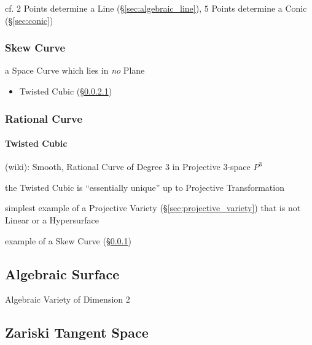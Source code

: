 cf. $2$ Points determine a Line (\S\ref{sec:algebraic_line}), $5$ Points
determine a Conic (\S\ref{sec:conic})



\subsubsection{Skew Curve}\label{sec:skew_curve}

a Space Curve which lies in \emph{no} Plane

\begin{itemize}
  \item Twisted Cubic (\S\ref{sec:twisted_cubic})
\end{itemize}



\subsubsection{Rational Curve}\label{sec:rational_curve}

\paragraph{Twisted Cubic}\label{sec:twisted_cubic}\hfill

(wiki): Smooth, Rational Curve of Degree $3$ in Projective $3$-space
$\xspace{P}^3$

the Twisted Cubic is ``essentially unique'' up to Projective Transformation

simplest example of a Projective Variety (\S\ref{sec:projective_variety}) that
is not Linear or a Hypersurface

example of a Skew Curve (\S\ref{sec:skew_curve})



\subsection{Algebraic Surface}\label{sec:algebraic_surface}

Algebraic Variety of Dimension 2



\subsection{Zariski Tangent Space}\label{sec:zariski_space}

